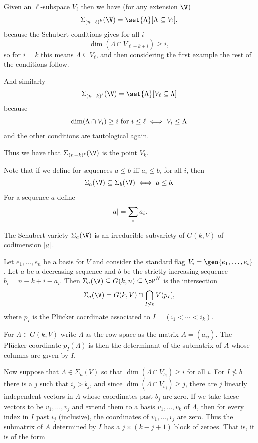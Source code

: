 \eexam

\bexam[name={schubertinclusion}]

    Given an $\ell$-subspace $V_\ell$ then we have (for any extension $\V$)
    $$ \Sigma_{(n-\ell)^k}(\V) = \set{\Lambda}[\Lambda\subseteq V_\ell] , $$
    because the Schubert conditions gives for all $i$
    $$ \dim(\Lambda\cap V_{\ell-k+i}) \geq i , $$
    so for $i=k$ this means $\Lambda\subseteq V_\ell$, and then considering the first example the rest of
    the conditions follow.

    And similarly
    $$ \Sigma_{(n-k)^\ell}(\V) = \set{\Lambda}[V_\ell\subseteq\Lambda] $$
    because
    $$ \dim(\Lambda\cap V_i) \geq i \hbox{ for $i\leq\ell$} \iff V_\ell \leq \Lambda $$
    and the other conditions are tautological again.

    Thus we have that $\Sigma_{(n-k)^k}(\V)$ is the point $V_k$.

\eexam

Note that if we define for sequences $a\leq b$ iff $a_i\leq b_i$ for all $i$, then
$$ \Sigma_a(\V) \subseteq \Sigma_b(\V) \iff a \leq b . $$
For a sequence $a$ define
$$ \mathopen{}\mathclose{\left|a\right|} = \sum_i a_i . $$

\bthrm

    The Schubert variety $\Sigma_a(\V)$ is an irreducible subvariety of $G(k,V)$ of codimension $\mathopen{}\mathclose{\left|a\right|}$.

\ethrm

\bprop[name={intwithlin}]

    Let $e_1,\dots,e_n$ be a basis for $V$ and consider the standard flag $V_i=\gen{e_1,\dots,e_i}$.
    Let $a$ be a decreasing sequence and $b$ be the strictly increasing sequence $b_i=n-k+i-a_i$.
    Then $\Sigma_a(\V)\subseteq G(k,n)\subseteq\bP^N$ is the intersection
    $$ \Sigma_a(\V) = G(k,V) \cap \bigcap_{I\not\leq b}V(p_I) , $$
    where $p_I$ is the Pl\"ucker coordinate associated to $I=(i_1<\cdots<i_k)$.

\eprop

\bproof

    For $\Lambda\in G(k,V)$ write $\Lambda$ as the row space as the matrix $A=(a_{ij})$.
    The Pl\"ucker coordinate $p_I(\Lambda)$ is then the determinant of the submatrix of $A$ whose columns
    are given by $I$.

    Now suppose that $\Lambda\in\Sigma_a(V)$ so that $\dim(\Lambda\cap V_{b_i})\geq i$ for all $i$.
    For $I\not\leq b$ there is a $j$ such that $i_j>b_j$, and since $\dim(\Lambda\cap V_{b_j})\geq j$,
    there are $j$ linearly independent vectors in $\Lambda$ whose coordinates past $b_j$ are zero.
    If we take these vectors to be $v_1,\dots,v_j$ and extend them to a basis $v_1,\dots,v_k$ of $\Lambda$,
    then for every index in $I$ past $i_j$ (inclusive), the coordinates of $v_1,\dots,v_j$ are zero.
    Thus the submatrix of $A$ determined by $I$ has a $j\times(k-j+1)$ block of zeroes.
    That is, it is of the form

